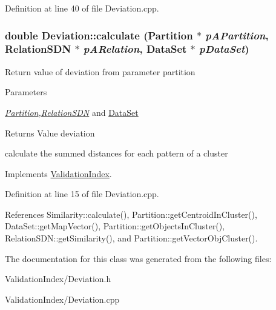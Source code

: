 Definition at line 40 of file Deviation.cpp.\hypertarget{classDeviation_aefedb81474f0d06827a2ceaecd93f43c}{
\subsubsection[{calculate}]{\setlength{\rightskip}{0pt plus 5cm}double Deviation::calculate ({\bf Partition} $\ast$ {\em pAPartition}, \/  {\bf RelationSDN} $\ast$ {\em pARelation}, \/  {\bf DataSet} $\ast$ {\em pDataSet})}}
\label{classDeviation_aefedb81474f0d06827a2ceaecd93f43c}
Return value of deviation from parameter partition 
\begin{DoxyParams}{Parameters}
\item[{\em \hyperlink{classPartition}{Partition},\hyperlink{classRelationSDN}{RelationSDN}}]and \hyperlink{classDataSet}{DataSet} \end{DoxyParams}
\begin{DoxyReturn}{Returns}
Value deviation 
\end{DoxyReturn}


calculate the summed distances for each pattern of a cluster 

Implements \hyperlink{classValidationIndex_a26fe1244f3313bd7f557149f6846fe01}{ValidationIndex}.

Definition at line 15 of file Deviation.cpp.

References Similarity::calculate(), Partition::getCentroidInCluster(), DataSet::getMapVector(), Partition::getObjectsInCluster(), RelationSDN::getSimilarity(), and Partition::getVectorObjCluster().

The documentation for this class was generated from the following files:\begin{DoxyCompactItemize}
\item 
ValidationIndex/Deviation.h\item 
ValidationIndex/Deviation.cpp\end{DoxyCompactItemize}
